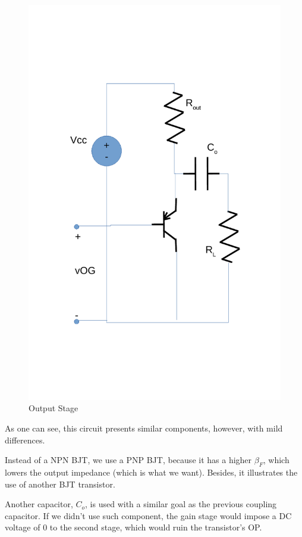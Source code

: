 \begin{figure}[h]
    \centering
    \includegraphics[scale=0.5]{output_stage_l4.pdf}
    \caption{Output Stage}
    \label{fig:regulator}
\end{figure}

As one can see, this circuit presents similar components, however, with mild differences.

Instead of a NPN BJT, we use a PNP BJT, because it has a higher $\beta_F$, which lowers the output impedance (which is what we want). Besides, it illustrates the use of another BJT transistor.

Another capacitor, $C_o$, is used with a similar goal as the previous coupling capacitor. If we didn't use such component, the gain stage would impose a DC voltage of 0 to the second stage, which would ruin the transistor's OP. 

